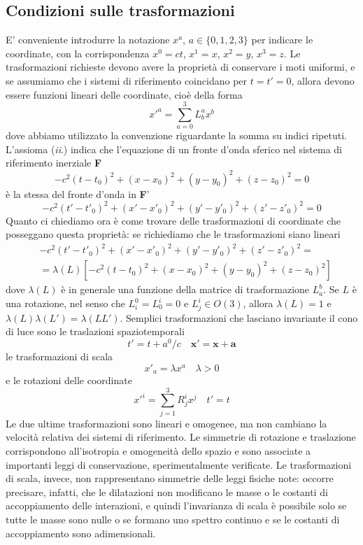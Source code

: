 \documentclass[a4paper,11pt]{book}
\theoremstyle{plain}
\theoremstyle{definition}
\begin{document}
\subsection{Condizioni sulle trasformazioni}
E' conveniente introdurre la notazione $x^a$, $a\in\{0,1,2,3\}$ per indicare le coordinate, con la corrispondenza $x^0=ct$, $x^1=x$, $x^2=y$, $x^3=z$. Le trasformazioni richieste devono avere la proprietà di conservare i moti uniformi, e se assumiamo che i sistemi di riferimento coincidano per $t=t'=0$, allora devono essere funzioni lineari delle coordinate, cioè della forma
\[
x'^a=\sum_{a=0}^3L^a_bx^b
\]
dove abbiamo utilizzato la convenzione riguardante la somma su indici ripetuti. L'assioma (\emph{ii}.) indica che l'equazione di un fronte d'onda sferico nel sistema di riferimento inerziale \textbf{F}
\[
-c^2(t-t_0)^2+(x-x_0)^2+(y-y_0)^2+(z-z_0)^2=0
\]
è la stessa del fronte d'onda in \textbf{F}'
\[
-c^2(t'-t'_0)^2+(x'-x'_0)^2+(y'-y'_0)^2+(z'-z'_0)^2=0
\]
Quanto ci chiediamo ora è come trovare delle trasformazioni di coordinate che posseggano questa proprietà: se richiediamo che le trasformazioni siano lineari
\begin{align*}
&-c^2(t'-t'_0)^2+(x'-x'_0)^2+(y'-y'_0)^2+(z'-z'_0)^2= \\
&=\lambda(L)[-c^2(t-t_0)^2+(x-x_0)^2+(y-y_0)^2+(z-z_0)^2]
\end{align*}
dove $\lambda(L)$ è in generale una funzione della matrice di trasformazione $L_a^b$. Se $L$ è una rotazione, nel senso che $L_i^0=L_0^i=0$ e $L_j^i\in O(3)$, allora $\lambda(L)=1$ e $\lambda(L)\lambda(L')=\lambda(LL')$. Semplici trasformazioni che lasciano invariante il cono di luce sono le traslazioni spaziotemporali
\[
t'=t+a^0/c \quad \textbf{x}'=\textbf{x}+\textbf{a}
\]
le trasformazioni di scala
\[
x'_a=\lambda x^a \quad \lambda>0
\]
e le rotazioni delle coordinate
\[
x'^i=\sum_{j=1}^3 R^i_j x^j \quad t'=t
\]
Le due ultime trasformazioni sono lineari e omogenee, ma non cambiano la velocità relativa dei sistemi di riferimento. Le simmetrie di rotazione e traslazione corrispondono all'isotropia e omogeneità dello spazio e sono associate a importanti leggi di conservazione, sperimentalmente verificate. Le trasformazioni di scala, invece, non rappresentano simmetrie delle leggi fisiche note: occorre precisare, infatti, che le dilatazioni non modificano le masse o le costanti di accoppiamento delle interazioni, e quindi l'invarianza di scala è possibile solo se tutte le masse sono nulle o se formano uno spettro continuo e se le costanti di accoppiamento sono adimensionali. 
\end{document}
